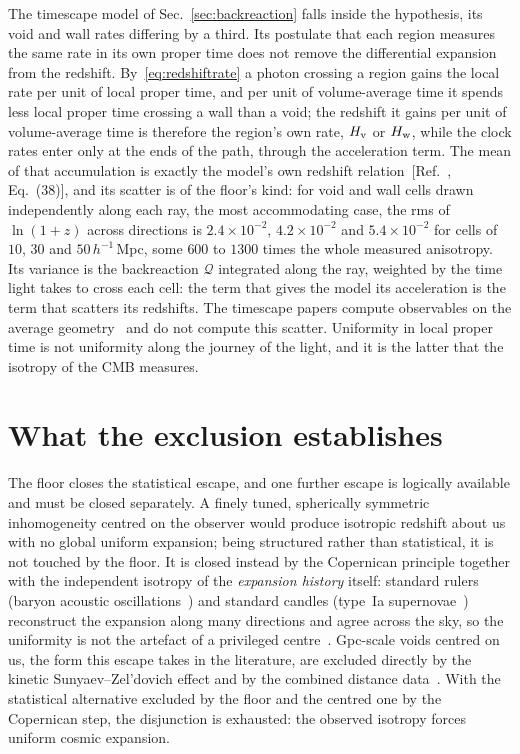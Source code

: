 \documentclass[aps,prd,reprint,amsmath,amssymb,superscriptaddress]{revtex4-2}
\begin{document}
The timescape model of Sec.~\ref{sec:backreaction} falls inside the hypothesis, its void and wall rates differing by a third. Its postulate that each region measures the same rate in its own proper time does not remove the differential expansion from the redshift. By~\eqref{eq:redshiftrate} a photon crossing a region gains the local rate per unit of local proper time, and per unit of volume-average time it spends less local proper time crossing a wall than a void; the redshift it gains per unit of volume-average time is therefore the region's own rate, $H_{\rm v}$ or $H_{\rm w}$, while the clock rates enter only at the ends of the path, through the acceleration term. The mean of that accumulation is exactly the model's own redshift relation~[Ref.~\cite{Wiltshire2009}, Eq.~(38)], and its scatter is of the floor's kind: for void and wall cells drawn independently along each ray, the most accommodating case, the rms of $\ln(1+z)$ across directions is $2.4\times10^{-2}$, $4.2\times10^{-2}$ and $5.4\times10^{-2}$ for cells of $10$, $30$ and $50\,h^{-1}$\,Mpc, some $600$ to $1300$ times the whole measured anisotropy. Its variance is the backreaction $\mathcal{Q}$ integrated along the ray, weighted by the time light takes to cross each cell: the term that gives the model its acceleration is the term that scatters its redshifts. The timescape papers compute observables on the average geometry~\cite{Wiltshire2009, NazerWiltshire2015, Seifert2025} and do not compute this scatter. Uniformity in local proper time is not uniformity along the journey of the light, and it is the latter that the isotropy of the CMB measures.

\section{What the exclusion establishes}\label{sec:establishes}

The floor closes the statistical escape, and one further escape is logically available and must be closed separately. A finely tuned, spherically symmetric inhomogeneity centred on the observer would produce isotropic redshift about us with no global uniform expansion; being structured rather than statistical, it is not touched by the floor. It is closed instead by the Copernican principle together with the independent isotropy of the \emph{expansion history} itself: standard rulers (baryon acoustic oscillations~\cite{Eisenstein2005}) and standard candles (type~Ia supernovae~\cite{Riess1998, Perlmutter1999}) reconstruct the expansion along many directions and agree across the sky, so the uniformity is not the artefact of a privileged centre~\cite{Barrett2000, Clarkson2010, Maartens2011}. Gpc-scale voids centred on us, the form this escape takes in the literature, are excluded directly by the kinetic Sunyaev--Zel'dovich effect and by the combined distance data~\cite{ZhangStebbins2011, Moss2011}. With the statistical alternative excluded by the floor and the centred one by the Copernican step, the disjunction is exhausted: the observed isotropy forces uniform cosmic expansion.
\end{document}
